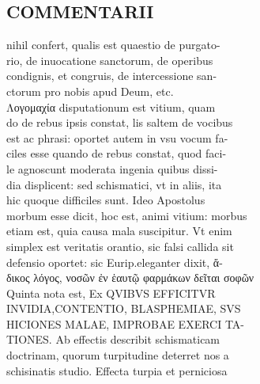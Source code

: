 \documentclass{article}
\begin{document}
\begin{pages}
\section*{COMMENTARII \\
                }nihil confert, qualis est quaestio de purgato- \\
                rio, de inuocatione sanctorum, de operibus \\
                condignis, et congruis, de intercessione san- \\
                ctorum pro nobis apud Deum, etc. \\
                Λογομαχία disputationum est vitium, quam \\
                do de rebus ipsis constat, lis saltem de vocibus \\
                est ac phrasi: oportet autem in vsu vocum fa- \\
                ciles esse quando de rebus constat, quod faci- \\
                le agnoscunt moderata ingenia quibus dissi- \\
                dia displicent: sed schismatici, vt in aliis, ita \\
                hic quoque difficiles sunt. Ideo Apostolus \\
                morbum esse dicit, hoc est, animi vitium: morbus \\
                etiam est, quia causa mala suscipitur. Vt enim \\
                simplex est veritatis orantio, sic falsi callida sit \\
                defensio oportet: sic Eurip.eleganter dixit, ἄ- \\
                δικος λόγος, νοσῶν ἐν ἑαυτῷ φαρμάκων δεῖται σοφῶν \\
                Quinta nota est, Ex QVIBVS EFFICITVR \\
                INVIDIA,CONTENTIO, BLASPHEMIAE, SVS \\
                HICIONES MALAE, IMPROBAE EXERCI TA- \\
                TIONES. Ab effectis describit schismaticam \\
                doctrinam, quorum turpitudine deterret nos a \\
                schisinatis studio. Effecta turpia et perniciosa \\

\end{pages}
\end{document}
